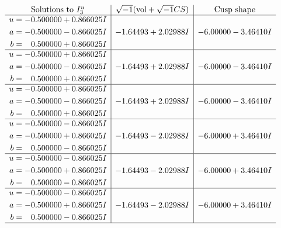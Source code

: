 \documentclass[1p]{elsarticle_modified}
\theoremstyle{definition}
\newcommand{\I}{\sqrt{-1}}
\begin{document}
$$\begin{array}{c|c|c}  
\text{Solutions to }I^u_{3}& \I (\text{vol} + \sqrt{-1}CS) & \text{Cusp shape}\\
 \hline 
\begin{aligned}
u &= -0.500000 + 0.866025 I \\
a &= -0.500000 - 0.866025 I \\
b &= \phantom{-}0.500000 + 0.866025 I\end{aligned}
 & -1.64493 + 2.02988 I & -6.00000 - 3.46410 I \\ \hline\begin{aligned}
u &= -0.500000 + 0.866025 I \\
a &= -0.500000 - 0.866025 I \\
b &= \phantom{-}0.500000 + 0.866025 I\end{aligned}
 & -1.64493 + 2.02988 I & -6.00000 - 3.46410 I \\ \hline\begin{aligned}
u &= -0.500000 + 0.866025 I \\
a &= -0.500000 - 0.866025 I \\
b &= \phantom{-}0.500000 + 0.866025 I\end{aligned}
 & -1.64493 + 2.02988 I & -6.00000 - 3.46410 I \\ \hline\begin{aligned}
u &= -0.500000 - 0.866025 I \\
a &= -0.500000 + 0.866025 I \\
b &= \phantom{-}0.500000 - 0.866025 I\end{aligned}
 & -1.64493 - 2.02988 I & -6.00000 + 3.46410 I \\ \hline\begin{aligned}
u &= -0.500000 - 0.866025 I \\
a &= -0.500000 + 0.866025 I \\
b &= \phantom{-}0.500000 - 0.866025 I\end{aligned}
 & -1.64493 - 2.02988 I & -6.00000 + 3.46410 I \\ \hline\begin{aligned}
u &= -0.500000 - 0.866025 I \\
a &= -0.500000 + 0.866025 I \\
b &= \phantom{-}0.500000 - 0.866025 I\end{aligned}
 & -1.64493 - 2.02988 I & -6.00000 + 3.46410 I\\
 \hline 
 \end{array}$$\newpage
\newpage\renewcommand{\arraystretch}{1}
\end{document}
